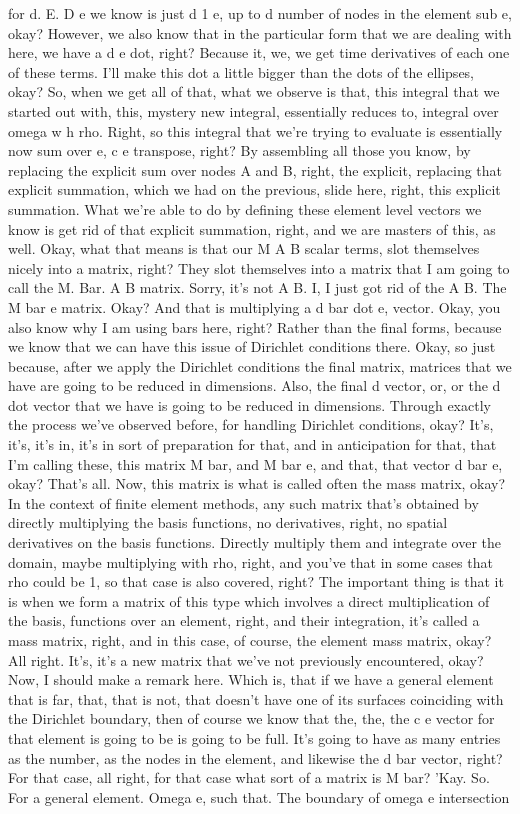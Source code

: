 \documentclass[10pt]{article}
\begin{document}
for d. E. D e we know is just d 1 e, up to d number of nodes in the element sub e, okay? However, we also know that in the particular form that we are dealing with here, we have a d e dot, right? Because it, we, we get time derivatives of each one of these terms. I'll make this dot a little bigger than the dots of the ellipses, okay? So, when we get all of that, what we observe is that, this integral that we started out with, this, mystery new integral, essentially reduces to, integral over omega w h rho. Right, so this integral that we're trying to evaluate is essentially now sum over e, c e transpose, right? By assembling all those you know, by replacing the explicit sum over nodes A and B, right, the explicit, replacing that explicit summation, which we had on the previous, slide here, right, this explicit summation. What we're able to do by defining these element level vectors we know is get rid of that explicit summation, right, and we are masters of this, as well. Okay, what that means is that our M A B scalar terms, slot themselves nicely into a matrix, right? They slot themselves into a matrix that I am going to call the M. Bar. A B matrix. Sorry, it's not A B. I, I just got rid of the A B. The M bar e matrix. Okay? And that is multiplying a d bar dot e, vector. Okay, you also know why I am using bars here, right? Rather than the final forms, because we know that we can have this issue of Dirichlet conditions there. Okay, so just because, after we apply the Dirichlet conditions the final matrix, matrices that we have are going to be reduced in dimensions.  Also, the final d vector, or, or the d dot vector that we have is going to be reduced in dimensions. Through exactly the process we've observed before, for handling Dirichlet conditions, okay? It's, it's, it's in, it's in sort of preparation for that, and in anticipation for that, that I'm calling these, this matrix M bar, and M bar e, and that, that vector d bar e, okay? That's all. Now, this matrix is what is called often the mass matrix, okay? In the context of finite element methods, any such matrix that's obtained by directly multiplying the basis functions, no derivatives, right, no spatial derivatives on the basis functions. Directly multiply them and integrate over the domain, maybe multiplying with rho, right, and you've that in some cases that rho could be 1, so that case is also covered, right? The important thing is that it is when we form a matrix of this type which involves a direct multiplication of the basis, functions over an element, right, and their integration, it's called a mass matrix, right, and in this case, of course, the element mass matrix, okay? All right. It's, it's a new matrix that we've not previously encountered, okay? Now, I should make a remark here. Which is, that if we have a general element that is far, that, that is not, that doesn't have one of its surfaces coinciding with the Dirichlet boundary, then of course we know that the, the, the c e vector for that element is going to be is going to be full. It's going to have as many entries as the number, as the nodes in the element, and likewise the d bar vector, right? For that case, all right, for that case what sort of a matrix is M bar? 'Kay. So. For a general element. Omega e, such that. The boundary of omega e intersection 
\end{document}
